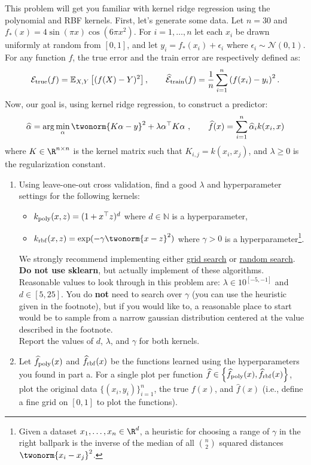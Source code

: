 \documentclass{article}
\begin{document}
\begin{aprob}
    This problem will get you familiar with kernel ridge regression using the polynomial and RBF kernels.
    First, let's generate some data. Let $n=30$ and $f_*(x) = 4 \sin(\pi x)\cos(6\pi x^2)$.
    For $i=1,\dots,n$ let each $x_i$ be drawn uniformly at random from $[0,1]$, and let $y_i = f_*(x_i) + \epsilon_i$ where $\epsilon_i \sim \mathcal{N}(0,1)$.
    For any function $f$, the true error and the train error are respectively defined as:
    $$\mathcal{E}_{\rm true}(f) = \mathbb{E}_{X,Y}\left[(f(X) - Y)^2\right], \quad \quad  \widehat{\mathcal{E}}_{\rm train}(f) =  \frac{1}{n} \sum_{i=1}^n \left(f(x_i)-y_i\right)^2.$$
    Now, our goal is, using kernel ridge regression, to construct a predictor:
    $$\widehat{\alpha} = \arg\min_\alpha \twonorm{K\alpha - y}^2 + \lambda \alpha^\top K \alpha \ , \quad \quad \widehat{f}(x) = \sum_{i=1}^n \widehat{\alpha}_i k(x_i,x)$$
    where $K\in\R^{n\times n}$ is the kernel matrix such that $K_{i,j} = k(x_i,x_j)$, and $\lambda\geq 0$ is the regularization constant.
    
    \begin{enumerate}
        \item {} Using leave-one-out cross validation, find a good $\lambda$ and hyperparameter settings for the following kernels:
        \begin{itemize}
            \item $k_{\rm poly}(x,z) = (1+x^\top z)^d$ where $d \in \mathbb{N}$ is a hyperparameter, 
            \item $k_{\rm rbf}(x,z) = \exp(-\gamma \twonorm{x-z}^2)$ where $\gamma > 0$ is a hyperparameter\footnote{Given a dataset $x_1,\dots,x_n \in \R^d$, a heuristic for choosing a range of $\gamma$ in the right ballpark is the inverse of the median of all $\binom{n}{2}$ squared distances $\twonorm{x_i-x_j}^2$.}.
        \end{itemize}
        We strongly recommend implementing either \href{https://en.wikipedia.org/wiki/Hyperparameter_optimization#Grid_search}{grid search} or \href{https://en.wikipedia.org/wiki/Hyperparameter_optimization#Random_search}{random search}. \textbf{Do not use sklearn}, but actually implement of these algorithms. Reasonable values to look through in this problem are: $\lambda \in 10^{[-5, -1]}$ and $d \in [5, 25]$. You do \textbf{not} need to search over $\gamma$ (you can use the heuristic given in the footnote), but if you would like to, a reasonable place to start would be to sample from a narrow gaussian distribution centered at the value described in the footnote. \\
        Report the values of $d$, $\lambda$, and $\gamma$ for both kernels.
        \item {} Let $\widehat{f}_{\rm poly}(x)$ and $\widehat{f}_{\rm rbf}(x)$ be the functions learned using the hyperparameters you found in part a.
        For a single plot per function $\widehat{f} \in \left\lbrace \widehat{f}_{\rm poly}(x), \widehat{f}_{\rm rbf}(x) \right\rbrace$, plot the original data $\{(x_i,y_i)\}_{i=1}^n$, the true $f(x)$, and $\widehat{f}(x)$ (i.e., define a fine grid on $[0,1]$ to plot the functions).
    \end{enumerate}

\end{aprob}
\end{document}
